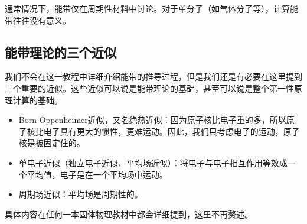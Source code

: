 \begin{attention}
    通常情况下，能带仅在周期性材料中讨论。对于单分子（如气体分子等），计算能带往往没有意义。
\end{attention}


\subsection{能带理论的三个近似}\label{subsec:能带理论基础-能带理论的三个近似}

我们不会在这一教程中详细介绍能带的推导过程，但是我们还是有必要在这里提到三个重要的近似。这些近似可以说是能带理论的基础，甚至可以说是整个第一性原理计算的基础。

\begin{itemize}
    \item Born-Oppenheimer近似，又名绝热近似：因为原子核比电子重的多，所以原子核比电子具有更大的惯性，更难运动。因此，我们只考虑电子的运动，原子核是被固定住的。
    \item 单电子近似（独立电子近似、平均场近似）：将电子与电子相互作用等效成一个平均值，电子是在一个平均场中运动。
    \item 周期场近似：平均场是周期性的。
\end{itemize}

具体内容在任何一本固体物理教材中都会详细提到，这里不再赘述。
